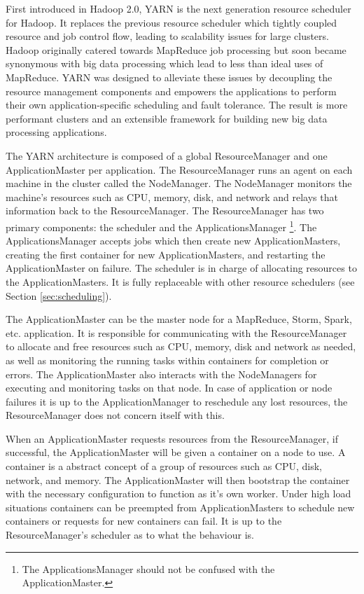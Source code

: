 \documentclass[12pt]{article}
\begin{document}
First introduced in Hadoop 2.0, YARN \cite{yarn} is the next generation resource scheduler for Hadoop. It replaces the previous resource scheduler which tightly coupled resource and job control flow, leading to scalability issues for large clusters. Hadoop originally catered towards MapReduce job processing but soon became synonymous with big data processing which lead to less than ideal uses of MapReduce. YARN was designed to alleviate these issues by decoupling the resource management components and empowers the applications to perform their own application-specific scheduling and fault tolerance. The result is more performant clusters and an extensible framework for building new big data processing applications.

The YARN architecture \cite{yarnarchitecture} is composed of a global ResourceManager and one ApplicationMaster per application. The ResourceManager runs an agent on each machine in the cluster called the NodeManager. The NodeManager monitors the machine's resources such as CPU, memory, disk, and network and relays that information back to the ResourceManager. The ResourceManager has two primary components: the scheduler and the ApplicationsManager \footnote{The ApplicationsManager should not be confused with the ApplicationMaster.}. The ApplicationsManager accepts jobs which then create new ApplicationMasters, creating the first container for new ApplicationMasters, and restarting the ApplicationMaster on failure. The scheduler is in charge of allocating resources to the ApplicationMasters. It is fully replaceable with other resource schedulers (see Section \ref{sec:scheduling}).

The ApplicationMaster can be the master node for a MapReduce, Storm, Spark, etc. application. It is responsible for communicating with the ResourceManager to allocate and free resources such as CPU, memory, disk and network as needed, as well as monitoring the running tasks within containers for completion or errors. The ApplicationMaster also interacts with the NodeManagers for executing and monitoring tasks on that node. In case of application or node failures it is up to the ApplicationManager to reschedule any lost resources, the ResourceManager does not concern itself with this.

When an ApplicationMaster requests resources from the ResourceManager, if successful, the ApplicationMaster will be given a container on a node to use. A container is a abstract concept of a group of resources such as CPU, disk, network, and memory. The ApplicationMaster will then bootstrap the container with the necessary configuration to function as it's own worker. Under high load situations containers can be preempted from ApplicationMasters to schedule new containers or requests for new containers can fail. It is up to the ResourceManager's scheduler as to what the behaviour is.
\end{document}
